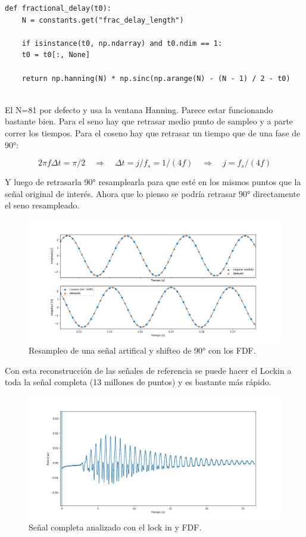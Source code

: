\begin{lstlisting}
def fractional_delay(t0):	
	N = constants.get("frac_delay_length")
	
	if isinstance(t0, np.ndarray) and t0.ndim == 1:
	t0 = t0[:, None]
	
	return np.hanning(N) * np.sinc(np.arange(N) - (N - 1) / 2 - t0)
	
\end{lstlisting}

El N=81 por defecto y usa la ventana Hanning. Parece estar funcionando bastante bien. Para el seno hay que retrasar medio punto de sampleo y a parte correr los tiempos. Para el coseno hay que retrasar un tiempo que de una fase de 90°:

\begin{equation}
	2\pi f \Delta t = \pi/2 \quad \Rightarrow \quad \Delta t = j/f_s = 1/(4f) \quad \Rightarrow \quad j = f_s/(4f)
\end{equation}

Y luego de retrasarla 90° resamplearla para que esté en los mismos puntos que la señal original de interés. Ahora que lo pienso se podría retrasar 90° directamente el seno resampleado. 

\begin{figure}[th!]
	\centering
	\includegraphics[width=0.87\linewidth]{Figures/09_06_2025/Fractional_Delay}
	\caption{Resampleo de una señal artifical y shifteo de 90° con los FDF.}
	\label{fig:fractionaldelay}
\end{figure}

Con esta reconstrucción de las señales de referencia se puede hacer el Lockin a toda la señal completa (13 millones de puntos) y es bastante más rápido. 

\begin{figure}[th!]
	\centering
	\includegraphics[width=0.987\linewidth]{Figures/09_06_2025/FDF_completa}
	\caption{Señal completa analizado con el lock in y FDF.}
	\label{fig:fdfcompleta}
\end{figure}

